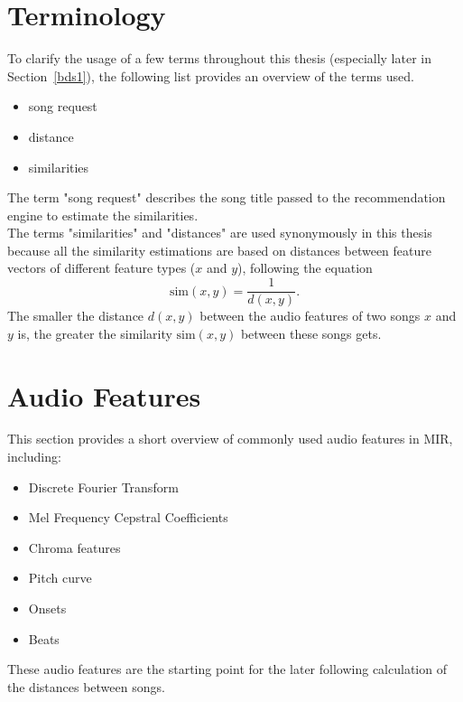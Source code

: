 \section{Terminology}

To clarify the usage of a few terms throughout this thesis (especially later in Section~\ref{bds1}), the following list provides an overview of the terms used.

\begin{itemize}
	\setlength\itemsep{-0.5em}
	\item song request
	\item distance
	\item similarities
\end{itemize}

\noindent The term "song request" describes the song title passed to the recommendation engine to estimate the similarities.\\
\noindent The terms "similarities" and "distances" are used synonymously in this thesis because all the similarity estimations are based on distances between feature vectors of different feature types ($x$ and $y$), following the equation
\begin{equation} \label{eq:distsim}
\text{sim}(x, y) = \frac{1}{d(x, y)}.
\end{equation}
The smaller the distance $d(x, y)$ between the audio features of two songs $x$ and $y$ is, the greater the similarity $\text{sim}(x, y)$ between these songs gets.\\

\section{Audio Features}\label{featsec2}

This section provides a short overview of commonly used audio features in MIR, including:

\begin{itemize}
	\setlength\itemsep{-0.5em}
	\item Discrete Fourier Transform
	\item Mel Frequency Cepstral Coefficients
	\item Chroma features
	\item Pitch curve
	\item Onsets
	\item Beats
\end{itemize}
These audio features are the starting point for the later following calculation of the distances between songs.

